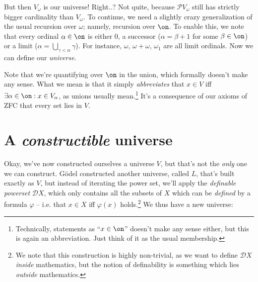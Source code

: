 But then $V_\omega$ is our universe! Right..? Not quite, because $\mathcal PV_\omega$ still has strictly bigger cardinality than $V_\omega$. To continue, we need a slightly crazy generalization of the usual recursion over $\omega$; namely, recursion over $\on$. To enable this, we note that every ordinal $\alpha\in\on$ is either $0$, a successor ($\alpha=\beta+1$ for some $\beta\in\on$) or a limit ($\alpha=\bigcup_{\gamma<\alpha}\gamma$). For instance, $\omega$, $\omega+\omega$, $\omega_1$ are all limit ordinals. Now we can define our \textit{universe}.


Note that we're quantifying over $\on$ in the union, which formally doesn't make any sense. What we mean is that it simply \textit{abbreviates} that $x\in V$ iff $\exists\alpha\in\on:x\in V_\alpha$, as unions usually mean.\footnote{Technically, statements as ``$x\in\on$'' doesn't make any sense either, but this is again an abbreviation. Just think of it as the usual membership.} It's a consequence of our axioms of ZFC that every set lies in $V$.

\pagebreak
\section{A \textit{constructible} universe}
Okay, we've now constructed ourselves a universe $V$, but that's not the \textit{only} one we can construct. Gödel constructed another universe, called $L$, that's built exactly as $V$, but instead of iterating the power set, we'll apply the \textit{definable powerset} $\mathcal DX$, which only contains all the subsets of $X$ which can be \textit{defined} by a formula $\varphi$ -- i.e. that $x\in X$ iff $\varphi(x)$ holds.\footnote{We note that this construction is highly non-trivial, as we want to define $\mathcal DX$ \textit{inside} mathematics, but the notion of definability is something which lies \textit{outside} mathematics.} We thus have a new universe:



